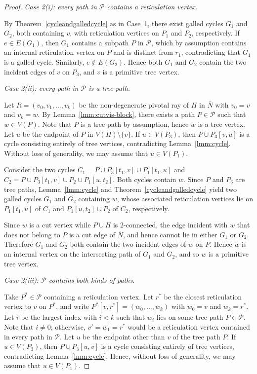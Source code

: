 \documentclass[pdflatex,sn-mathphys-num]{sn-jnl}
\theoremstyle{thmstyleone}%
\theoremstyle{thmstyletwo}%
\theoremstyle{thmstylethree}%
\begin{document}
\begin{proof}
\smallskip
\noindent\emph{Case 2(i): every path in $\mathcal{P}$ contains a reticulation vertex.}

By Theorem~\ref{cycleandgalledcycle} as in Case~1, there exist galled cycles $G_1$ and $G_2$, both containing $v$, with reticulation vertices on $P_1$ and $P_2$, respectively. If $e \in E(G_1)$, then $G_1$ contains a subpath $P$ in $\mathcal{P}$, which by assumption contains an internal reticulation vertex on $P$ and is distinct from $r_1$, contradicting that $G_1$ is a galled cycle. Similarly, $e\notin E(G_2)$. Hence both $G_1$ and $G_2$ contain the two incident edges of $v$ on $P_3$, and $v$ is a primitive tree vertex.



\smallskip
\noindent\emph{Case 2(ii): every path in $\mathcal{P}$ is a tree path.}

Let $R=(v_0,v_1,\dots,v_k)$ be the non-degenerate pivotal ray of $H$ in $\overline{N}$ with $v_0=v$ and $v_k=w$. By Lemma~\ref{lmm:cutvis-block}, there exists a path $P\in\mathcal{P}$ such that $w\in V(P)$. Note that $P$ is a tree path by assumption, hence $w$ is a tree vertex.  Let $u$ be the endpoint of $P$ in $V(H)\setminus\{v\}$.  If $u\in V(P_3)$, then $P \cup P_3[v,u]$ is a cycle consisting entirely of tree vertices, contradicting Lemma~\ref{lmm:cycle}. Without loss of generality, we may assume that $u\in V(P_1)$.

Consider the two cycles
$C_1=P\cup P_3[t_1,v]\cup P_1[t_1,u]$
and
$C_2=P\cup P_3[t_1,v]\cup P_2\cup P_1[u,t_2]$.
Both cycles contain $w$. Since $P$ and $P_3$ are tree paths, Lemma~\ref{lmm:cycle} and Theorem~\ref{cycleandgalledcycle} yield two galled cycles $G_1$ and $G_2$ containing $w$, whose associated reticulation vertices lie on $P_1[t_1,u]$ of $C_1$ and $P_1[u,t_2]\cup P_2$ of $C_2$, respectively.

Since $w$ is a cut vertex while $P \cup H$ is 2-connected, the edge incident with $w$ that does not belong to $P$ is a cut edge of $\overline{N}$, and hence cannot lie in either $G_1$ or $G_2$. Therefore $G_1$ and $G_2$ both contain the two incident edges of $w$ on $P$. Hence $w$ is an internal vertex on the intersecting path of $G_1$ and $G_2$, and so $w$ is a primitive tree vertex.





\smallskip
\noindent\emph{Case 2(iii): $\mathcal{P}$ contains both kinds of paths.}

Take $P^* \in \mathcal{P}$ containing a reticulation vertex. Let $r^*$ be the closest reticulation vertex to $v$ on $P^*$, and write
$P^*[v,r^*]=(w_0,\dots,w_k)$ with $w_0=v$ and $w_k=r^*$. Let $i$ be the largest index with $i<k$ such that $w_i$ lies on some tree path $P\in\mathcal{P}$. Note that $i\ne 0$; otherwise, $v'=w_1=r^*$ would be a reticulation vertex contained in every path in $\mathcal{P}$. Let $u$ be the endpoint other than $v$  of the tree path $P$. If $u\in V(P_3)$, then $P \cup P_3[u,v]$ is a cycle consisting entirely of tree vertices, contradicting Lemma~\ref{lmm:cycle}. Hence, without loss of generality, we may assume that $u\in V(P_1)$.


\end{proof}
\end{document}
